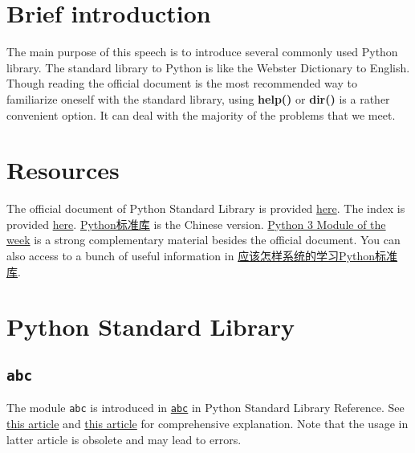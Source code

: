 \documentclass[english]{../TeXTemplate/pkupaper}
\title{\titlemark}
\author{Yifei Wang\quad pppppass}
\date{February 26, 2018}
\begin{document}
\raggedright

\maketitle
\tableofcontents
\section{Brief introduction}
The main purpose of this speech is to introduce several commonly used Python library. The standard library to Python is like the Webster Dictionary to English. Though reading the official document is the most recommended way to familiarize oneself with the standard library, using \textbf{help()} or \textbf{dir()} is a rather convenient option. It can deal with the majority of the problems that we meet. 

\section{Resources}
The official document of Python Standard Library is provided \href{https://docs.python.org/3.6/library/index.html}{here}. The index is provided \href{https://docs.python.org/3.6/py-modindex.html}{here}.  \href{http://python.usyiyi.cn/translate/python_352/library/index.html}{Python标准库} is the Chinese version. \href{https://pymotw.com/3/index.html}{Python 3 Module of the week} is a strong complementary material besides the official document. You can also access to a bunch of useful information in \href{https://www.zhihu.com/question/22100190}{应该怎样系统的学习Python标准库}.

\section{Python Standard Library}








\subsection{\texttt{abc}}

The module \verb"abc" is introduced in \href{https://docs.python.org/3/library/abc.html}{\texttt{abc}} in Python Standard Library Reference. See \href{https://segmentfault.com/a/1190000007921371}{this article} and \href{https://www.jianshu.com/p/19ed49293168}{this article} for comprehensive explanation. Note that the usage in latter article is obsolete and may lead to errors.
\end{document}
